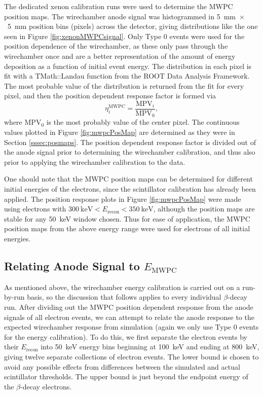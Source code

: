 The dedicated xenon calibration runs were used to determine the MWPC position maps.
The wirechamber anode signal was histogrammed in 5~mm~$\times$~5~mm position bins (pixels) across the detector,
giving distributions like the one seen in Figure \ref{fig:xenonMWPCsignal}. Only Type 0 events were used
for the position dependence of the wirechamber, as these only pass through the wirechamber once and are a better
representation of the amount of energy deposition as a function of initial event energy. The distribution
in each pixel is fit with a TMath::Landau function from the ROOT Data Analysis Framework.
The most probable value of
the distribution is returned from the fit for every pixel, and then the position dependent response factor is formed
via
%
\begin{equation}
  \eta^{\mathrm{MWPC}}_i = \frac{\mathrm{MPV}_i}{\mathrm{MPV}_0},
\end{equation}
where $\mathrm{MPV}_0$ is the most probably value of the center pixel.
The continuous values plotted in Figure \ref{fig:mwpcPosMap} are determined as they were in
Section \ref{sssec:posmaps}. The position dependent response factor is divided out of the anode signal
prior to determining the wirechamber calibration, and thus also prior to applying the wirechamber
calibration to the data.

One should note that the MWPC position maps can be determined for different initial energies of the
electrons, since the scintillator calibration has already been applied. The position response plots
in Figure \ref{fig:mwpcPosMap} were made using electrons with $300\mathrm{~keV}<E_{\mathrm{recon}}<350\mathrm{~keV}$,
although the position maps are stable for any 50~keV window chosen. Thus for ease of application, the MWPC position
maps from the above energy range were used for electrons of all initial energies.


\subsection{Relating Anode Signal to $E_{\mathrm{MWPC}}$}

As mentioned above, the wirechamber energy calibration is carried out on a run-by-run basis, so
the discussion that follows applies to every individual $\beta$-decay run.
After dividing out the MWPC position dependent response from the anode signals of all electron events,
we can attempt to relate the anode response to the expected wirechamber response from simulation (again
we only use Type 0 events for the energy calibration). 
To do this, we first separate the electron events by their $E_{\mathrm{recon}}$ into 50~keV energy bins beginning at 100~keV and ending at
800~keV, giving twelve separate collections of electron events. The lower bound is chosen to avoid any possible
effects from differences between the simulated and actual scintillator thresholds. The upper bound is just beyond
the endpoint energy of the $\beta$-decay electrons.

